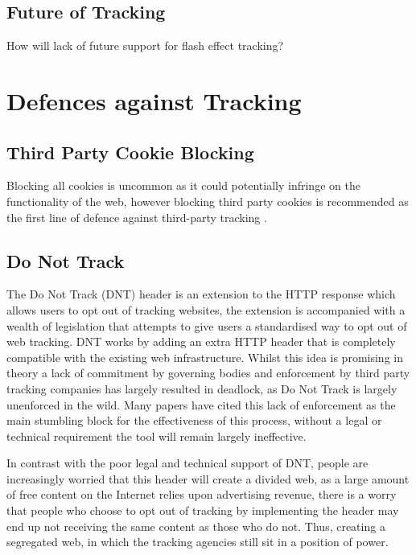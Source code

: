 \documentclass{article}
\begin{document}
\subsection{Future of Tracking}
How will lack of future support for flash effect tracking?

\section{Defences against Tracking}
\subsection{Third Party Cookie Blocking}
Blocking all cookies is uncommon as it could potentially infringe on the functionality of the web, however blocking third party cookies is recommended as the first line of defence against third-party tracking \parencite{roesner}. 

\subsection{Do Not Track}
The Do Not Track (DNT) header is an extension to the HTTP response which allows users to opt out of tracking websites, the extension is accompanied with a wealth of legislation that attempts to give users a standardised way to opt out of web tracking. DNT works by adding an extra HTTP header that is completely compatible with the existing web infrastructure. Whilst this idea is promising in theory a lack of commitment by governing bodies and enforcement by third party tracking companies has largely resulted in deadlock, as Do Not Track is largely unenforced in the wild. Many papers have cited this lack of enforcement as the main stumbling block for the effectiveness of this process, without a legal or technical requirement the tool will remain largely ineffective. \newline

In contrast with the poor legal and technical support of DNT, people are increasingly worried that this header will create a divided web, as a large amount of free content on the Internet relies upon advertising revenue, there is a worry that people who choose to opt out of tracking by implementing the header may end up not receiving the same content as those who do not. Thus, creating a segregated web, in which the tracking agencies still sit in a position of power. 
\end{document}

